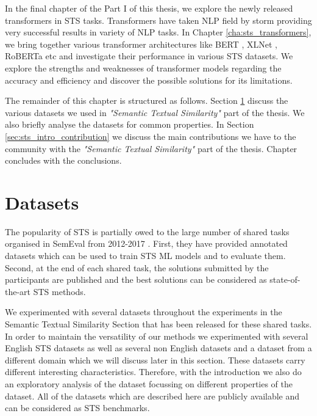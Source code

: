 In the final chapter of the Part I of this thesis, we explore the newly released transformers in STS tasks. Transformers have taken NLP field by storm providing very successful results in variety of NLP tasks. In Chapter \ref{cha:sts_transformers}, we bring together various transformer architectures like BERT \cite{devlin-etal-2019-bert}, XLNet \cite{yang2019xlnet}, RoBERTa \cite{liu2019roberta} etc and investigate their performance in various STS datasets. We explore the strengths and weaknesses of transformer models regarding the accuracy and efficiency and discover the possible solutions for its limitations.

The remainder of this chapter is structured as follows. Section \ref{sec:sts_intro_datsets} discuss the various datasets we used in \textit{"Semantic Textual Similarity"} part of the thesis. We also briefly analyse the datasets for common properties. In Section \ref{sec:sts_intro_contribution} we discuss the main contributions we have to the community with the \textit{"Semantic Textual Similarity"} part of the thesis. Chapter concludes with the conclusions.


\section{Datasets}
\label{sec:sts_intro_datsets}
The popularity of STS is partially owed to the large number of shared tasks organised in SemEval from 2012-2017 \cite{agirre-etal-2012-semeval,agirre-etal-2013-sem,agirre-etal-2014-semeval,agirre-etal-2015-semeval,agirre-etal-2016-semeval,cer-etal-2017-semeval}. First, they have provided annotated datasets which can be used to train STS ML models and to evaluate them. Second, at the end of each shared task, the solutions submitted by the participants are published and the best solutions can be considered as state-of-the-art STS methods. 

We experimented with several datasets throughout the experiments in the Semantic Textual Similarity Section that has been released for these shared tasks. In order to maintain the versatility of our methods we experimented with several English STS datasets as well as several non English datasets and a dataset from a different domain which we will discuss later in this section. These datasets carry different interesting characteristics. Therefore, with the introduction we also do an exploratory analysis of the dataset focussing on different properties of the dataset. All of the datasets which are described here are publicly available and can be considered as STS benchmarks. 

